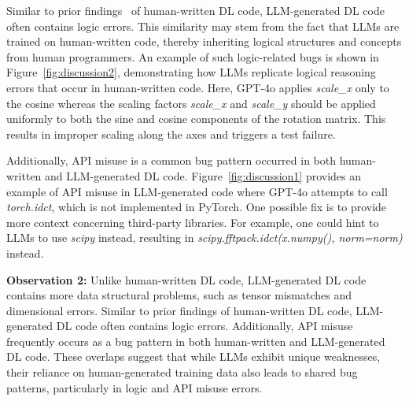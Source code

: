 

Similar to prior findings~\cite{islam2019comprehensive} of human-written DL code, LLM-generated DL code often contains  
logic errors.
This similarity may stem from the fact that LLMs are trained on human-written code, thereby inheriting logical structures and concepts from human programmers. An example of such logic-related bugs is shown in Figure~\ref{fig:discussion2}, demonstrating how LLMs replicate logical reasoning errors that occur in human-written code. Here, GPT-4o applies \textit{scale\_x} only to the cosine whereas the scaling factors \textit{scale\_x} and \textit{scale\_y} should be applied uniformly to both the sine and cosine components of the rotation matrix. This results in improper scaling along the axes and triggers a test failure.


Additionally, API misuse is a common bug pattern occurred in both human-written and LLM-generated DL code.
Figure~\ref{fig:discussion1} provides an example of API misuse in LLM-generated code where GPT-4o attempts to call \textit{torch.idct}, which is not implemented in PyTorch. One possible fix is to provide more context concerning third-party libraries. For example, one could hint to LLMs to use \textit{scipy} instead, resulting in \textit{scipy.fftpack.idct(x.numpy(), norm=norm)} instead.

\begin{tcolorbox}[boxrule=0.5pt, colback=gray!10,  arc=4pt,left=3pt,right=3pt,top=3pt,bottom=3pt,boxsep=0pt
]
\textbf{Observation 2:} Unlike human-written DL code, LLM-generated DL code contains more data structural problems, such as tensor mismatches and dimensional errors. 
Similar to prior findings of human-written DL code, LLM-generated DL code often contains logic errors.
Additionally, API misuse frequently occurs as a bug pattern in both human-written and LLM-generated DL code.
These overlaps suggest that while LLMs exhibit unique weaknesses, their reliance on human-generated training data also leads to shared bug patterns, particularly in logic and API misuse errors.

\end{tcolorbox}

